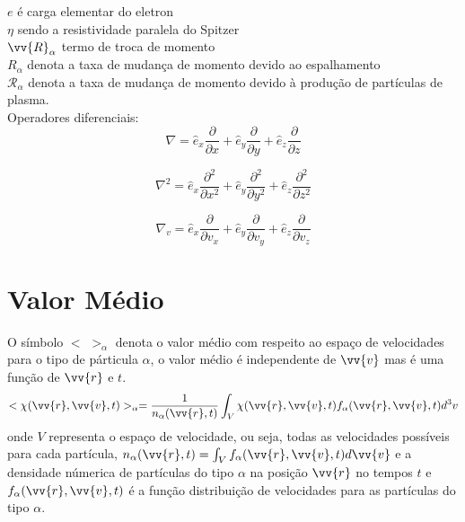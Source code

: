 \documentclass[12pt,oneside,a4paper]{abntex2}
\theoremstyle{definition}  %
\begin{document}
$e$ é  carga elementar do eletron\\
$\eta$ sendo a resistividade paralela do Spitzer\\
$\vv{R}_\alpha$ termo de troca de momento\\
$R_\alpha$ denota a taxa de mudança de momento devido ao espalhamento\\
$\mathcal{R}_\alpha$ denota a taxa de mudança de momento devido à produção de partículas de plasma.
\\
Operadores diferenciais:
\begin{equation*}
\nabla = \hat{e}_x \frac{\partial}{\partial x} + \hat{e}_y \frac{\partial}{\partial y} + \hat{e}_z \frac{\partial}{\partial z}
\end{equation*}

\begin{equation*}
\nabla^2 = \hat{e}_x \frac{\partial^2}{\partial x^2} + \hat{e}_y \frac{\partial^2}{\partial y^2} + \hat{e}_z \frac{\partial^2}{\partial z^2}
\end{equation*}

\begin{equation*}
\nabla_v = \hat{e}_x \frac{\partial}{\partial v_x} + \hat{e}_y \frac{\partial}{\partial v_y} + \hat{e}_z \frac{\partial}{\partial v_z}
\end{equation*} 

\chapter{Valor Médio}
O símbolo $<$  $>_\alpha$ denota o valor médio com respeito ao espaço de velocidades para o tipo de párticula $\alpha$, o valor médio é independente de $\vv{v}$ mas é uma função de $\vv{r}$ e $t$.
\begin{equation}
<\chi(\vv{r},\vv{v},t)>_\alpha = \frac{1}{n_\alpha(\vv{r},t)} \int_V \chi(\vv{r},\vv{v},t) f_\alpha(\vv{r},\vv{v},t) d^3 v
\label{anexo1}
\end{equation}
onde $V$ representa o espaço de velocidade, ou seja, todas as velocidades possíveis para cada partícula, $n_\alpha(\vv{r},t)=\int_V{f_\alpha(\vv{r},\vv{v},t)}d\vv{v}$ e a densidade númerica de partículas do tipo $\alpha$ na posição $\vv{r}$ no tempos $t$ e $f_\alpha(\vv{r},\vv{v},t)$ é a função distribuição de velocidades para as partículas do tipo $\alpha$.
\end{document}
